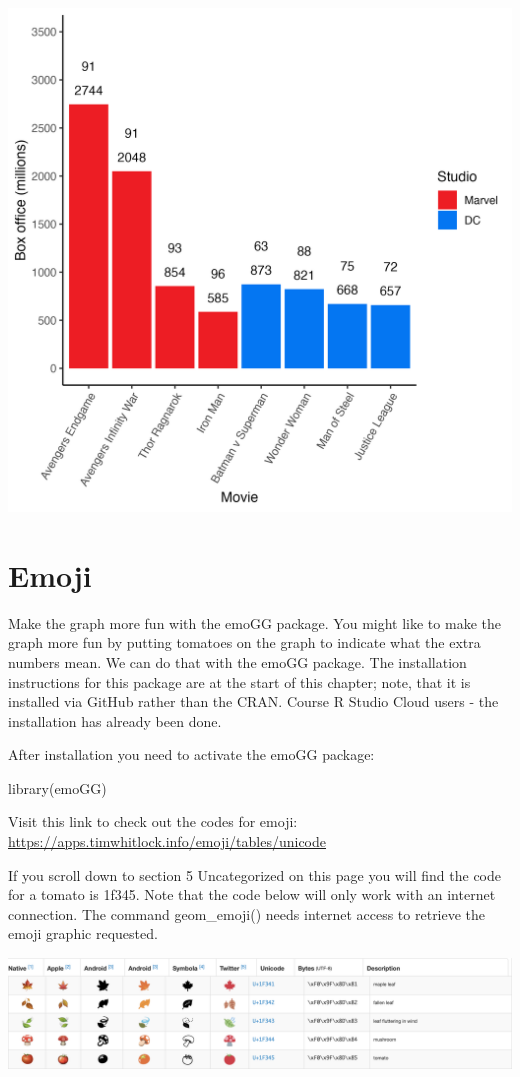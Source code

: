 \documentclass[
]{krantz}
\makeatletter
\newenvironment{Shaded}{\begin{snugshade}}{\end{snugshade}}
\newcommand{\FunctionTok}[1]{\textcolor[rgb]{0,0,0}{#1}}
\newcommand{\NormalTok}[1]{#1}
\newenvironment{kframe}{%
\medskip{}
\setlength{\fboxsep}{.8em}
 \def\at@end@of@kframe{}%
 \ifinner\ifhmode%
  \def\at@end@of@kframe{\end{minipage}}%
  \begin{minipage}{\columnwidth}%
 \fi\fi%
 \def\FrameCommand##1{\hskip\@totalleftmargin \hskip-\fboxsep
 \colorbox{shadecolor}{##1}\hskip-\fboxsep
     \hskip-\linewidth \hskip-\@totalleftmargin \hskip\columnwidth}%
 \MakeFramed {\advance\hsize-\width
   \@totalleftmargin\z@ \linewidth\hsize
   \@setminipage}}%
 {\par\unskip\endMakeFramed%
 \at@end@of@kframe}
\renewenvironment{Shaded}{\begin{kframe}}{\end{kframe}}
\makeatother
\begin{document}
\includegraphics[width=0.65\linewidth]{ch_graphing/images/logo_color_graph}

\hypertarget{emoji}{%
\section{Emoji}\label{emoji}}

Make the graph more fun with the emoGG package. You might like to make the graph more fun by putting tomatoes on the graph to indicate what the extra numbers mean. We can do that with the emoGG package. The installation instructions for this package are at the start of this chapter; note, that it is installed via GitHub rather than the CRAN. Course R Studio Cloud users - the installation has already been done.

After installation you need to activate the emoGG package:

\begin{Shaded}
\begin{Highlighting}[]
\FunctionTok{library}\NormalTok{(emoGG)}
\end{Highlighting}
\end{Shaded}

Visit this link to check out the codes for emoji: \url{https://apps.timwhitlock.info/emoji/tables/unicode}

If you scroll down to section 5 Uncategorized on this page you will find the code for a tomato is 1f345. Note that the code below will only work with an internet connection. The command geom\_emoji() needs internet access to retrieve the emoji graphic requested.

\includegraphics[width=0.9\linewidth]{ch_graphing/images/emoji_table}
\end{document}
